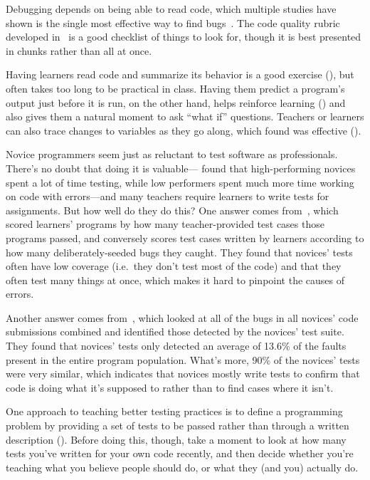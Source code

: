 Debugging depends on being able to read code,
which multiple studies have shown is the single most effective way to find bugs~\cite{Basi1987,Keme2009,Bacc2013}.
The code quality rubric developed in~\cite{Steg2014,Steg2016a}
is a good checklist of things to look for,
though it is best presented in chunks rather than all at once.

Having learners read code and summarize its behavior is a good exercise (),
but often takes too long to be practical in class.
Having them predict a program's output just before it is run,
on the other hand,
helps reinforce learning ()
and also gives them a natural moment to ask ``what if'' questions.
Teachers or learners can also trace changes to variables as they go along,
which \cite{Cunn2017} found was effective ().


Novice programmers seem just as reluctant to test software as professionals.
There's no doubt that doing it is valuable---\cite{Cart2017} found that
high-performing novices spent a lot of time testing,
while low performers spent much more time working on code with errors---and many teachers
require learners to write tests for assignments.
But how well do they do this?
One answer comes from~\cite{Bria2015},
which scored learners' programs by how many teacher-provided test cases those programs passed,
and conversely scores test cases written by learners according to how many deliberately-seeded bugs they caught.
They found that novices' tests often have low coverage (i.e.\ they don't test most of the code)
and that they often test many things at once, which makes it hard to pinpoint the causes of errors.

Another answer comes from~\cite{Edwa2014b},
which looked at all of the bugs in all novices' code submissions combined
and identified those detected by the novices' test suite.
They found that novices' tests only detected an average of 13.6\% of the faults present in the entire program population.
What's more,
90\% of the novices' tests were very similar,
which indicates that novices mostly write tests to confirm that code is doing what it's supposed to
rather than to find cases where it isn't.

One approach to teaching better testing practices is
to define a programming problem by providing a set of tests to be passed
rather than through a written description ().
Before doing this,
though,
take a moment to look at how many tests you've written for your own code recently,
and then decide whether you're teaching what you believe people should do,
or what they (and you) actually do.

